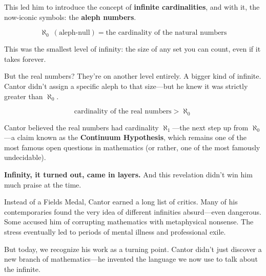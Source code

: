 This led him to introduce the concept of \textbf{infinite cardinalities}, and with it, the now-iconic symbols: the \textbf{aleph numbers}.

\[
\aleph_0\ (\text{aleph-null}) = \text{the cardinality of the natural numbers}
\]

This was the smallest level of infinity: the size of any set you can count, even if it takes forever.

But the real numbers? They’re on another level entirely. A bigger kind of infinite. Cantor didn’t assign a specific aleph to that size—but he knew it was strictly greater than $\aleph_0$.

\[
\text{cardinality of the real numbers} > \aleph_0
\]

Cantor believed the real numbers had cardinality $\aleph_1$—the next step up from $\aleph_0$—a claim known as the \textbf{Continuum Hypothesis}, which remains one of the most famous open questions in mathematics (or rather, one of the most famously undecidable).





\textbf{Infinity, it turned out, came in layers.} And this revelation didn’t win him much praise at the time.





Instead of a Fields Medal, Cantor earned a long list of critics. Many of his contemporaries found the very idea of different infinities absurd—even dangerous. Some accused him of corrupting mathematics with metaphysical nonsense. The stress eventually led to periods of mental illness and professional exile.

But today, we recognize his work as a turning point. Cantor didn’t just discover a new branch of mathematics—he invented the language we now use to talk about the infinite.


